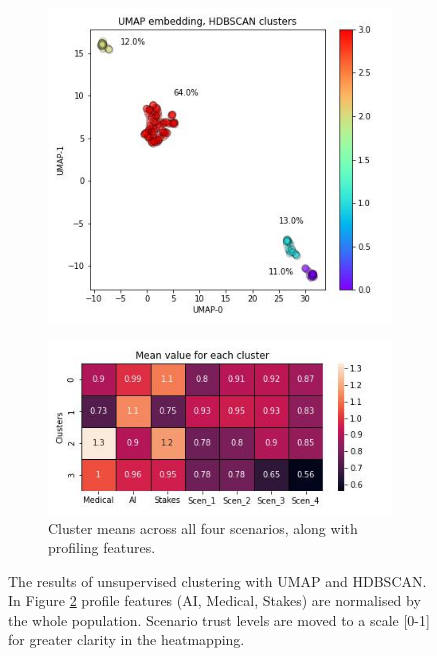 \documentclass[manuscript,screen,review]{acmart}
\begin{document}
\begin{figure}
\centering
\begin{subfigure}{0.5\textwidth}
  \centering
  \includegraphics[width=\linewidth]{graphics/UMAP_HDBSCAN.jpg}
  \caption{}
  \label{fig:embedding}
\end{subfigure}%
\begin{subfigure}{0.55\textwidth}
  \centering
  \includegraphics[width=\linewidth]{graphics/clustering_means.jpg}
  \caption{Cluster means across all four scenarios, along with profiling features.}
  \label{fig:cluster_means}
\end{subfigure}
\caption{The results of unsupervised clustering with UMAP and HDBSCAN. In Figure \ref{fig:cluster_means} profile features (AI, Medical, Stakes) are normalised by the whole population. Scenario trust levels are moved to a scale [0-1] for greater clarity in the heatmapping.}
\label{fig:test}
\end{figure}
\end{document}
